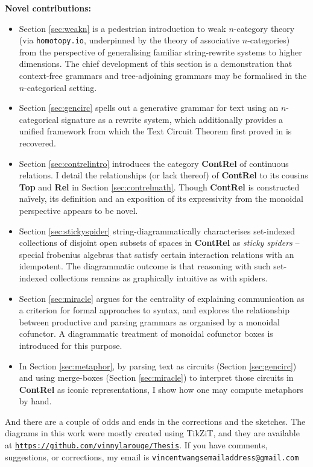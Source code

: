 \clearpage
\begin{myboxB}
\textbf{Novel contributions:}
\begin{itemize}

\item Section \ref{sec:weakn} is a pedestrian introduction to weak $n$-category theory (via \texttt{homotopy.io}, underpinned by the theory of associative $n$-categories) from the perspective of generalising familiar string-rewrite systems to higher dimensions. The chief development of this section is a demonstration that context-free grammars and tree-adjoining grammars may be formalised in the $n$-categorical setting.

\item Section \ref{sec:gencirc} spells out a generative grammar for text using an $n$-categorical signature as a rewrite system, which additionally provides a unified framework from which the Text Circuit Theorem first proved in \citep{wang-mascianicaDistillingTextCircuits2023a} is recovered.

\item Section \ref{sec:contrelintro} introduces the category \textbf{ContRel} of continuous relations. I detail the relationships (or lack thereof) of \textbf{ContRel} to its cousins \textbf{Top} and \textbf{Rel} in Section \ref{sec:contrelmath}. Though \textbf{ContRel} is constructed na\"{i}vely, its definition and an exposition of its expressivity from the monoidal perspective appears to be novel.

\item Section \ref{sec:stickyspider} string-diagrammatically characterises set-indexed collections of disjoint open subsets of spaces in \textbf{ContRel} as \emph{sticky spiders} -- special frobenius algebras that satisfy certain interaction relations with an idempotent. The diagrammatic outcome is that reasoning with such set-indexed collections remains as graphically intuitive as with spiders.

\item Section \ref{sec:miracle} argues for the centrality of explaining communication as a criterion for formal approaches to syntax, and explores the relationship between productive and parsing grammars as organised by a monoidal cofunctor. A diagrammatic treatment of monoidal cofunctor boxes is introduced for this purpose.

\item In Section \ref{sec:metaphor}, by parsing text as circuits (Section \ref{sec:gencirc}) and using merge-boxes (Section \ref{sec:miracle}) to interpret those circuits in \textbf{ContRel} as iconic representations, I show how one may compute metaphors by hand.
\end{itemize}

And there are a couple of odds and ends in the corrections and the sketches. The diagrams in this work were mostly created using TikZiT, and they are available at \href{https://github.com/vinnylarouge/Thesis}{\texttt{https://github.com/vinnylarouge/Thesis}}. If you have comments, suggestions, or corrections, my email is \texttt{vincentwangsemailaddress@gmail.com}
\end{myboxB}
\vfill
\clearpage
\newpage


